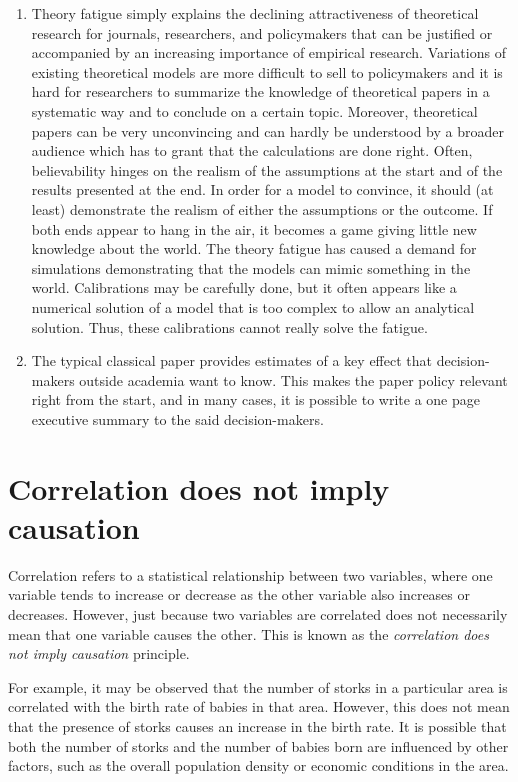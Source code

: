 \documentclass[
  12pt,
  oneside]{book}
\theoremstyle{definition}
\theoremstyle{definition}
\theoremstyle{definition}
\theoremstyle{definition}
\theoremstyle{remark}
\begin{document}
\begin{enumerate}
\def\labelenumi{\alph{enumi})}
\setcounter{enumi}{2}
\item
  Theory fatigue simply explains the declining attractiveness of theoretical research for journals, researchers, and policymakers that can be justified or accompanied by an increasing importance of empirical research. Variations of existing theoretical models are more difficult to sell to policymakers and it is hard for researchers to summarize the knowledge of theoretical papers in a systematic way and to conclude on a certain topic. Moreover, theoretical papers can be very unconvincing and can hardly be understood by a broader audience which has to grant that the calculations are done right. Often, believability hinges on the realism of the assumptions at the start and of the results presented at the end. In order for a model to convince, it should (at least) demonstrate the realism of either the assumptions or the outcome. If both ends appear to hang in the air, it becomes a game giving little new knowledge about the world. The theory fatigue has caused a demand for simulations demonstrating that the models can mimic something in the world. Calibrations may be carefully done, but it often appears like a numerical solution of a model that is too complex to allow an analytical solution. Thus, these calibrations cannot really solve the fatigue.
\item
  The typical classical paper provides estimates of a key effect that decision-makers outside
  academia want to know. This makes the paper policy relevant right from the start, and in
  many cases, it is possible to write a one page executive summary to the said decision-makers.
\end{enumerate}

\hypertarget{cornotcaus}{%
\section{Correlation does not imply causation}\label{cornotcaus}}

Correlation refers to a statistical relationship between two variables, where one variable tends to increase or decrease as the other variable also increases or decreases. However, just because two variables are correlated does not necessarily mean that one variable causes the other. This is known as the \emph{correlation does not imply causation} principle.

For example, it may be observed that the number of storks in a particular area is correlated with the birth rate of babies in that area. However, this does not mean that the presence of storks causes an increase in the birth rate. It is possible that both the number of storks and the number of babies born are influenced by other factors, such as the overall population density or economic conditions in the area.
\end{document}
